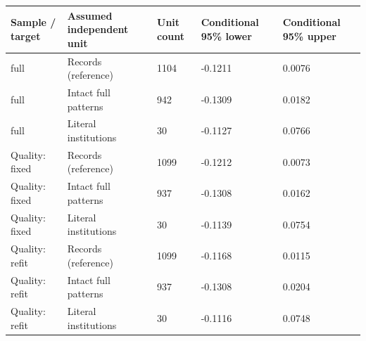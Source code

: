 \begin{tabular}{lllll}
\toprule
Sample / target & Assumed independent unit & Unit count & Conditional 95\% lower & Conditional 95\% upper \\
\midrule
full & Records (reference) & 1104 & -0.1211 & 0.0076 \\
full & Intact full patterns & 942 & -0.1309 & 0.0182 \\
full & Literal institutions & 30 & -0.1127 & 0.0766 \\
Quality: fixed & Records (reference) & 1099 & -0.1212 & 0.0073 \\
Quality: fixed & Intact full patterns & 937 & -0.1308 & 0.0162 \\
Quality: fixed & Literal institutions & 30 & -0.1139 & 0.0754 \\
Quality: refit & Records (reference) & 1099 & -0.1168 & 0.0115 \\
Quality: refit & Intact full patterns & 937 & -0.1308 & 0.0204 \\
Quality: refit & Literal institutions & 30 & -0.1116 & 0.0748 \\
\bottomrule
\end{tabular}
